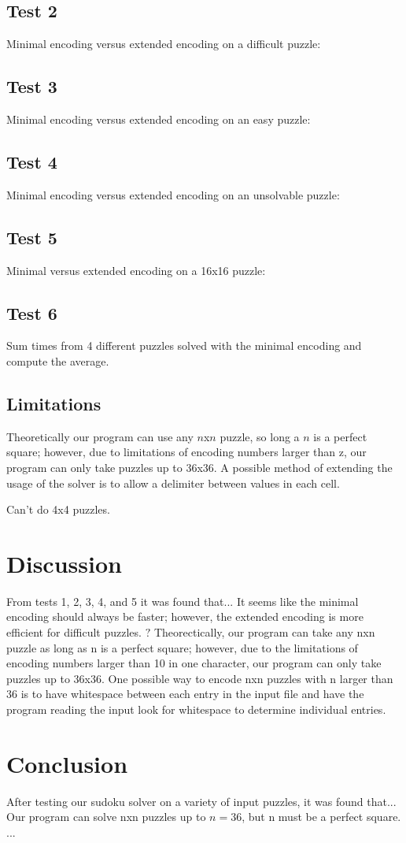 \documentclass[conference,draftclsnofoot]{IEEEtran}
\begin{document}
\subsection{Test 2}
Minimal encoding versus extended encoding on a difficult puzzle:


\subsection{Test 3}
Minimal encoding versus extended encoding on an easy puzzle:

\subsection{Test 4}
Minimal encoding versus extended encoding on an unsolvable puzzle:

\subsection{Test 5}
Minimal versus extended encoding on a 16x16 puzzle:

\subsection{Test 6}
Sum times from 4 different puzzles solved with the minimal encoding and compute
the average.



\subsection{Limitations}
Theoretically our program can use any $n$x$n$ puzzle, so long a $n$ is a
perfect square; however, due to limitations of encoding numbers larger than z,
our program can only take puzzles up to 36x36. A possible method of extending
the usage of the solver is to allow a delimiter between values in each cell.


Can't do 4x4 puzzles.

\section{Discussion}
From tests 1, 2, 3, 4, and 5 it was found that...  It seems like the minimal
encoding should always be faster; however, the extended encoding is more
efficient for difficult puzzles. \(?\)
Theorectically, our program can take any nxn puzzle as long as n is a perfect
square; however, due to the limitations of encoding numbers larger than 10 in
one character, our program can only take puzzles up to 36x36. One possible way
to encode nxn puzzles with n larger than 36 is to have whitespace between each
entry in the input file and have the program reading the input look for
whitespace to determine individual entries.

\section{Conclusion}
After testing our sudoku solver on a variety of input puzzles, it was found
that...  Our program can solve nxn puzzles up to $n=36$, but n must be a
perfect square.  ...
\end{document}
